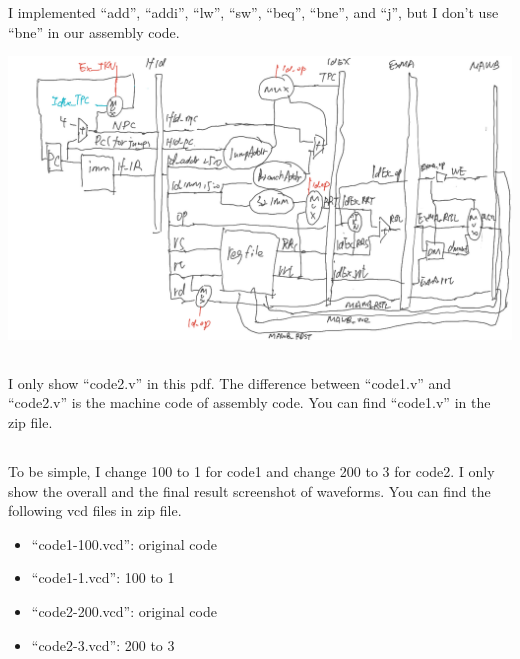 \documentclass{article}
\begin{document}
\section{}
\subsection{}
I implemented ``add'', ``addi'', ``lw'', ``sw'', ``beq'', ``bne'', and ``j'', but I don't use ``bne'' in our assembly code.

\includegraphics[width=\textwidth]{diagram}

\subsection{}
I only show ``code2.v'' in this pdf. The difference between ``code1.v'' and ``code2.v'' is the machine code of assembly code. You can find ``code1.v'' in the zip file.


\subsection{}
To be simple, I change 100 to 1 for code1 and change 200 to 3 for code2. I only show the overall and the final result screenshot of waveforms. You can find the following vcd files in zip file.
\begin{itemize}
  \item ``code1-100.vcd'': original code
  \item ``code1-1.vcd'': 100 to 1
  \item ``code2-200.vcd'': original code
  \item ``code2-3.vcd'': 200 to 3
\end{itemize}
\end{document}

